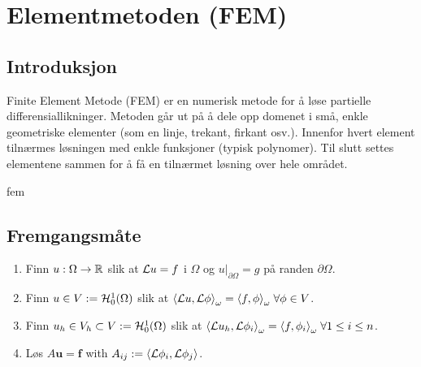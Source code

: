 \chapter{Elementmetoden (FEM)}

\section{Introduksjon}

Finite Element Metode (FEM) er en numerisk metode for å løse partielle differensiallikninger.
Metoden går ut på å dele opp domenet i små, enkle geometriske elementer (som en linje, trekant, firkant osv.).
Innenfor hvert element tilnærmes løsningen med enkle funksjoner (typisk polynomer).
Til slutt settes elementene sammen for å få en tilnærmet løsning over hele området.

\glsdesc{fem}

\section{Fremgangsmåte}
\begin{enumerate}
	\item Finn \(u: \Omega \rightarrow \R\) slik at \(\Lcal u = f\) i \(\Omega\) og \(u\big|_{\partial\Omega} = g\) på randen \(\partial\Omega\).

	\item Finn \(u \in V := \Hcal_0^1(\Omega)\) slik at \(\inner*{\Lcal u,\Lcal \phi}_\omega = \inner*{f, \phi}_\omega \; \forall \phi \in V\).

	\item Finn \(u_h \in V_h \subset V := \Hcal_0^1(\Omega)\) slik at \(\inner*{\Lcal u_h,\Lcal \phi_i}_\omega = \inner*{f, \phi_i}_\omega \; \forall 1\leq i \leq n\).

	\item Løs \(A\symbf{u} = \symbf{f}\) with \(A_{ij} := \inner*{\Lcal \phi_i, \Lcal \phi_j}\).
\end{enumerate}

